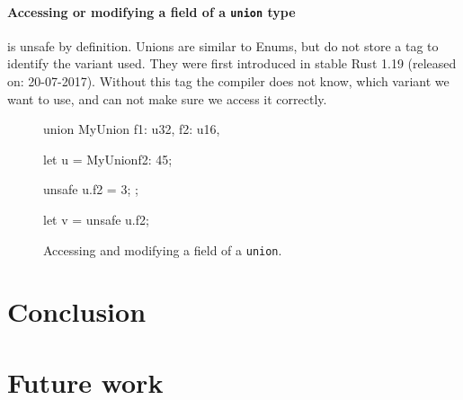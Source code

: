 \documentclass[twocolumn]{article}
\begin{document}
\paragraph{Accessing or modifying a field of a \texttt{union} type} is unsafe by definition.
Unions are similar to Enums, but do not store a tag to identify the variant used.
They were first introduced in stable Rust 1.19 (released on: 20-07-2017)\cite{RustRelease-Union}.
Without this tag the compiler does not know, which variant we want to use, and can not make sure we access it correctly.
\begin{figure}
\begin{rustcode}
union MyUnion {
    f1: u32,
    f2: u16,
}

let u = MyUnion{f2: 45};

unsafe {
    u.f2 = 3;
};

let v = unsafe {u.f2};
\end{rustcode}
\vspace{-2em}
\caption{Accessing and modifying a field of a \texttt{union}.}
\label{unsafe-union}
\end{figure}
\section{Conclusion}
\section{Future work}




\end{document}
